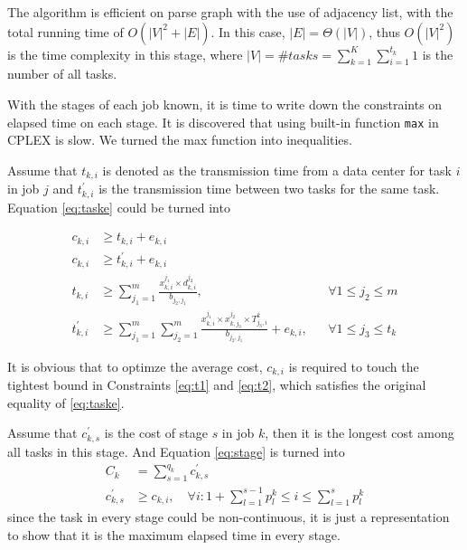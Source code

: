 \documentclass{llncs}
\begin{document}
The algorithm is efficient on parse graph with the use of adjacency list, with the total running time of $O(|V|^2+|E|)$. In this case, $|E|=\Theta(|V|)$, thus $O(|V|^2)$ is the time complexity in this stage, where $|V|=\# tasks=\sum_{k=1}^K\sum_{i=1}^{t_k}1$ is the number of all tasks.

With the stages of each job known, it is time to write down the constraints on elapsed time on each stage. It is discovered that using built-in function \verb"max" in CPLEX is slow. We turned the max function into inequalities. 

Assume that $t_{k,i}$ is denoted as the transmission time from a data center for task $i$ in job $j$ and $t_{k,i}^\prime$ is the transmission time between two tasks for the same task. Equation \eqref{eq:taske} could be turned into

\begin{align}
    c_{k,i} &\geq t_{k,i} + e_{k,i} \label{eq:t1}\\
    c_{k,i} &\geq t_{k,i}^\prime + e_{k,i} \label{eq:t2}\\
    t_{k,i} &\geq \sum_{j_1=1}^m \frac{x_{k,i}^{j_1}\times d_{k,i}^{j_2}}{b_{j_2,j_1}},&& \forall 1\leq j_2\leq m\\
    t_{k,i}^\prime &\geq \sum_{j_1=1}^m\sum_{j_2=1}^m \frac{x_{k,i}^{j_1}\times x_{k,j_3}^{j_2}\times T_{j_3,i}^k}{b_{j_2,j_1}} + e_{k,i},&& \forall 1\leq j_3\leq t_k\label{eq:tend}
\end{align}

It is obvious that to optimze the average cost, $c_{k,i}$ is required to touch the tightest bound in Constraints \eqref{eq:t1} and \eqref{eq:t2}, which satisfies the original equality of \eqref{eq:taske}.

Assume that $c^\prime_{k,s}$ is the cost of stage $s$ in job $k$, then it is the longest cost among all tasks in this stage. And Equation \eqref{eq:stage} is turned into
\begin{align}
    C_k &= \sum_{s=1}^{q_k} c^{\prime}_{k,s} \label{eq:jobm1}\\
    c^\prime_{k,s} &\geq c_{k,i},\quad \forall i: 1+\sum_{l=1}^{s-1} p_{l}^k \leq i \leq \sum_{l=1}^{s} p_{l}^k \label{eq:jobm2}
\end{align}
since the task in every stage could be non-continuous, it is just a representation to show that it is the maximum elapsed time in every stage.

\end{document}
